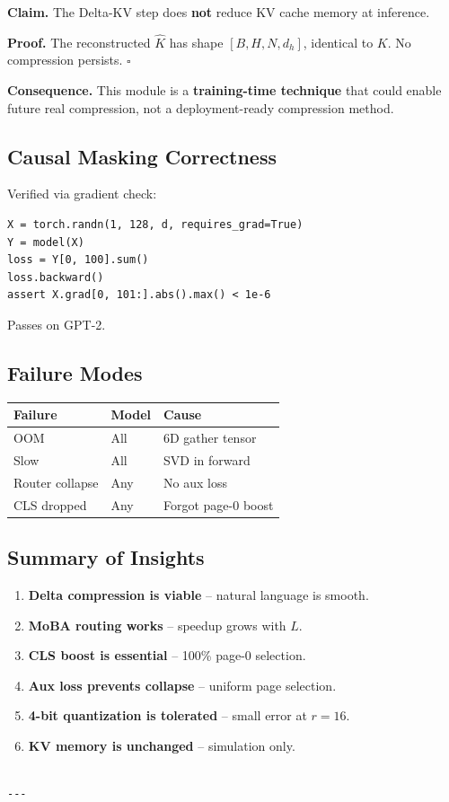 \textbf{Claim.} The Delta-KV step does \textbf{not} reduce KV cache memory at inference.

\textbf{Proof.} The reconstructed $\hat{K}$ has shape $[B, H, N, d_h]$, identical 
to $K$. No compression persists. $\square$

\textbf{Consequence.} This module is a \textbf{training-time technique} that could 
enable future real compression, not a deployment-ready compression method.

\subsection{Causal Masking Correctness}

Verified via gradient check:

\begin{lstlisting}
X = torch.randn(1, 128, d, requires_grad=True)
Y = model(X)
loss = Y[0, 100].sum()
loss.backward()
assert X.grad[0, 101:].abs().max() < 1e-6
\end{lstlisting}

Passes on GPT-2.

\subsection{Failure Modes}

\begin{table}[H]
\centering
\small
\begin{tabular}{lll}
\toprule
\textbf{Failure} & \textbf{Model} & \textbf{Cause} \\
\midrule
OOM & All & 6D gather tensor \\
Slow & All & SVD in forward \\
Router collapse & Any & No aux loss \\
CLS dropped & Any & Forgot page-0 boost \\
\bottomrule
\end{tabular}
\end{table}

\subsection{Summary of Insights}

\begin{enumerate}
\item \textbf{Delta compression is viable} -- natural language is smooth.
\item \textbf{MoBA routing works} -- speedup grows with $L$.
\item \textbf{CLS boost is essential} -- 100\% page-0 selection.
\item \textbf{Aux loss prevents collapse} -- uniform page selection.
\item \textbf{4-bit quantization is tolerated} -- small error at $r = 16$.
\item \textbf{KV memory is unchanged} -- simulation only.
\end{enumerate}
\begin{lstlisting}

---
\end{lstlisting}